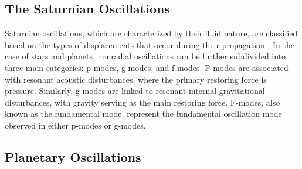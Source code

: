 \documentclass{article}
\begin{document}
\subsection{The Saturnian Oscillations}
Saturnian oscillations, which are characterized by their fluid nature, are classified based on the types of displacements that occur during their propagation \cite{Marley1993PlanetaryAM}. In the case of stars and planets, nonradial oscillations can be further subdivided into three main categories: p-modes, g-modes, and f-modes. P-modes are associated with resonant acoustic disturbances, where the primary restoring force is pressure. Similarly, g-modes are linked to resonant internal gravitational disturbances, with gravity serving as the main restoring force. F-modes, also known as the fundamental mode, represent the fundamental oscillation mode observed in either p-modes or g-modes.


\subsection{Planetary Oscillations}
\end{document}
